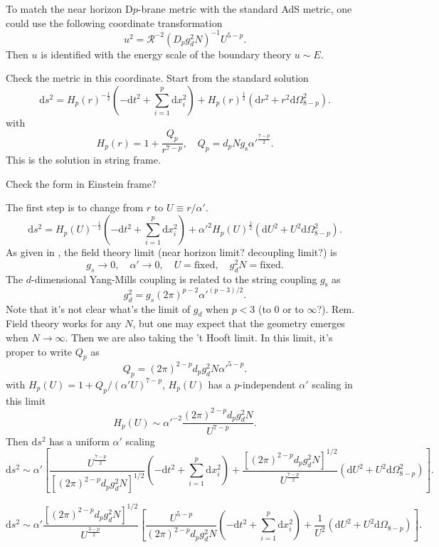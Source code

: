 
To match the near horizon D$p$-brane metric with the standard AdS metric,
one could use the following coordinate transformation 	
\[
	u^2 = \mathcal{R}^{-2} (D_p g_d^2 N)^{-1} U^{5-p}
.\] 
Then $u$ is identified with the energy scale of the boundary theory $u\sim E$.

Check the metric in this coordinate.
Start from the standard solution
\[
	\mathrm{d}s^2 = H_p(r)^{-\frac{1}{2}} \left( 
	-\mathrm{d}t^2 + \sum_{i=1}^p \mathrm{d}x_i^2\right)
	+ H_p(r)^{\frac{1}{2}} \left( \mathrm{d}r^2 + r^2 \mathrm{d}\Omega_{8-p}^2 \right) 
.\] 
with
\[
	H_p(r) = 1 + \frac{Q_p}{r^{7-p}},\quad Q_p = d_p N g_{\text{s}} \alpha'^{\frac{7-p}{2}}
.\] 
This is the solution in string frame.

\begin{question}
	Check the form in Einstein frame?
\end{question}

The first step is to change from $r$ to $U\equiv r / \alpha'$.
\[
	\mathrm{d}s^2 = H_p(U)^{- \frac{1}{2}} \left( -\mathrm{d}t^2 + \sum_{i=1}^p \mathrm{d}x_i^2\right) + \alpha'^2 H_p(U)^{\frac{1}{2}} \left( \mathrm{d}U^2 + U^2 \mathrm{d}\Omega_{8-p}^2 \right) 
.\] 
As given in , the field theory limit (near horizon limit? decoupling limit?) is
\[
	g_s \to 0,\quad \alpha' \to 0,\quad U = \text{fixed},\quad g_d^2 N = \text{fixed}
.\] 
The $d$-dimensional Yang-Mills coupling is related to the string coupling $g_{\text{s}}$ as
\[
	g_d^2 = g_s (2\pi)^{p-2} \alpha'^{(p-3) / 2}
.\] 
Note that it's not clear what's the limit of $g_{d}$ when $p<3$ (to $0$ or to $\infty$?).
Rem. Field theory works for any $N$, but one may expect that the geometry emerges when $N\to\infty$.
Then we are also taking the 't Hooft limit.
In this limit, it's proper to write $Q_p$ as
\[
	Q_p = (2\pi)^{2-p} d_p g_d^2 N \alpha'^{5-p}
.\] 
with $H_p(U) = 1 + Q_p / (\alpha' U)^{7-p}$, $H_p(U)$ has a $p$-independent $\alpha'$ scaling in this limit
\[
	H_p(U) \sim \alpha'^{-2} \frac{(2\pi)^{2-p} d_p g_d^2 N}{U^{7-p}}
.\] 
Then $\mathrm{d}s^2$ has a uniform $\alpha'$ scaling
\[
	\mathrm{d}s^2 \sim \alpha' \left[ \frac{U^{\frac{7-p}{2}}}{[(2\pi)^{2-p}d_p g_d^2 N]^{1 / 2}} \left( -\mathrm{d} t^2 + \sum_{i=1}^p \mathrm{d}x_i^2 \right) + \frac{[(2\pi)^{2-p}d_p g_d^2 N]^{1 / 2}}{U^{\frac{7-p}{2}}} \left( \mathrm{d}U^2 + U^2 \mathrm{d}\Omega_{8-p}^2 \right)   \right]
.\] 

\[
	\mathrm{d}s^2 \sim \alpha' \frac{[(2\pi)^{2-p}d_p g_d^2 N]^{1 / 2}}{U^{\frac{3-p}{2}}}
	\left[ \frac{U^{5-p}}{(2\pi)^{2-p} d_p g_d^2 N} 
		\left( - \mathrm{d}t^2 + \sum_{i=1}^p \mathrm{d}x_i^2 \right) 
	+ \frac{1}{U^2}\left( \mathrm{d}U^2 + U^2 \mathrm{d}\Omega_{8-p} \right)\right] 
.\] 

